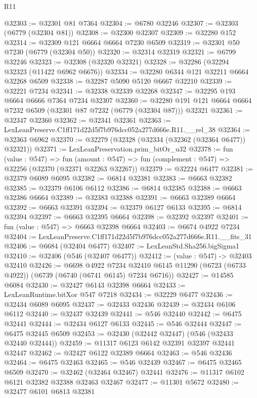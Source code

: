 \begin{lexlean}{R11}
\begin{coremodule}
@32303 := @32301 @81 @7364
@32304 := @6780 @32246
@32307 := @32303 (@6779 (@32304 @81))
@32308 := @32300 @32307
@32309 := @32280 @152
@32314 := @32309 @121 @6664 @6664 @7230 @6509
@32319 := @32301 @50 @7230 (@6779 (@32304 @50))
@32320 := @32314 @32319
@32321 := @6799 @32246
@32323 := @32308 (@32320 @32321)
@32328 := @32286 (@32294 @32323 (@11422 @6962 @6676))
@32334 := @32280 @6344 @121 @32211 @6664 @32268 @6509
@32338 := @32287 @5090 @5120 @6667 @32210
@32339 := @32221 @7234
@32341 := @32338 @32339 @32268
@32347 := @32295 @193 @6664 @6666 @7364 @7234 @32307
@32360 := @32280 @191 @121 @6664 @6664 @7232 @6509 (@32301 @87 @7232 (@6779 (@32304 @87))) @32321
@32361 := @32347 @32360
@32362 := @32341 @32361
@32363 := LexLeanPreserve.C1ff171d22d5f7b976dcc052a277d666e.R11.__rel_38
@32364 := @32363 @6962
@32370 := @32279 (@32328 (@32334 (@32362 (@32364 @6477)) @32321))
@32371 := LexLeanPreservation.prim_bitOr_u32
@32378 := fun (value : @547) =>
  fun (amount : @547) => fun (complement : @547) => @32256 (@32370 (@32371 @32263 @32267))
@32379 := @32224 @6477
@32381 := @32379 @6089 @6095
@32382 := @6814 @32381
@32383 := @6663 @32382
@32385 := @32379 @6106 @6112
@32386 := @6814 @32385
@32388 := @6663 @32386 @6664
@32389 := @32383 @32388
@32391 := @6663 @32389 @6664
@32392 := @6663 @32391
@32394 := @32379 @6127 @6133
@32395 := @6814 @32394
@32397 := @6663 @32395 @6664
@32398 := @32392 @32397
@32401 := fun (value : @547) => @6663 @32398 @6664
@32403 := @6674 @4922 @7234
@32404 := LexLeanPreserve.C1ff171d22d5f7b976dcc052a277d666e.R11.__fits_31
@32406 := @6684 (@32404 @6477)
@32407 := LexLeanStd.Sha256.bigSigma1
@32410 := @32406 (@546 (@32407 @6477))
@32412 := (value : @547) -> @32403 @32410
@32426 := @6698
    @4922
    @7234
    @32410
    @6145
    @11290
    (@6723 (@6733 @4922))
    (@6739 (@6740 (@6741 @6145) @7234 @6716))
@32427 := @14585 @6084
@32430 := @32427 @6143 @32398 @6664
@32433 := LexLeanRuntime.bitXor @547 @7218
@32434 := @32229 @6477
@32436 := @32434 @6089 @6095
@32437 := @32433 @32436
@32439 := @32434 @6106 @6112
@32440 := @32437 @32439
@32441 := @546 @32440
@32442 := @6475 @32441
@32444 := @32434 @6127 @6133
@32445 := @546 @32444
@32447 := @6475 @32445 @6509
@32453 := @32430 (@32442 @32447) (@546 (@32433 @32440 @32444))
@32459 := @11317 @6123 @6142 @32391 @32397 @32441 @32447
@32462 := @32427 @6122 @32389 @6664
@32463 := @546 @32436
@32464 := @6475 @32463
@32465 := @546 @32439
@32467 := @6475 @32465 @6509
@32470 := @32462 (@32464 @32467) @32441
@32476 := @11317 @6102 @6121 @32382 @32388 @32463 @32467
@32477 := @11301 @5672
@32480 := @32477 @6101 @6813 @32381

\end{coremodule}
\end{lexlean}
